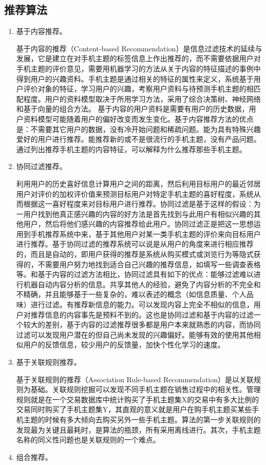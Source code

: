     \subsection{推荐算法}
    \begin{enumerate}[(1)]
    \item 基于内容推荐。

    基于内容的推荐（Content-based Recommendation）是信息过滤技术的延续与发展，它是建立在对手机主题的标签信息上作出推荐的，而不需要依据用户对手机主题的评价意见，需要用机器学习的方法从关于内容的特征描述的事例中得到用户的兴趣资料。手机主题是通过相关的特征的属性来定义，系统基于用户评价对象的特征，学习用户的兴趣，考察用户资料与待预测手机主题的相匹配程度。用户的资料模型取决于所用学习方法，采用了综合决策树、神经网络和基于向量的组合方法。 基于内容的用户资料是需要有用户的历史数据，用户资料模型可能随着用户的偏好改变而发生变化。基于内容推荐方法的优点是：不需要其它用户的数据，没有冷开始问题和稀疏问题。能为具有特殊兴趣爱好的用户进行推荐。能推荐新的或不是很流行的手机主题，没有产品问题。通过列出推荐手机主题的内容特征，可以解释为什么推荐那些手机主题。
    \item 协同过滤推荐。

    利用用户的历史喜好信息计算用户之间的距离，然后利用目标用户的最近邻居用户对评价的加权评价值来预测目标用户对特定手机主题的喜好程度，系统从而根据这一喜好程度来对目标用户进行推荐。协同过滤是基于这样的假设：为一用户找到他真正感兴趣的内容的好方法是首先找到与此用户有相似兴趣的其他用户，然后将他们感兴趣的内容推荐给此用户。协同过滤正是把这一思想运用到手机推荐系统中来，基于其他用户对某一类手机主题的评价来向目标用户进行推荐。基于协同过滤的推荐系统可以说是从用户的角度来进行相应推荐的，而且是自动的，即用户获得的推荐是系统从购买模式或浏览行为等隐式获得的，不需要用户努力地找到适合自己兴趣的推荐信息，如填写一些调查表格等。和基于内容的过滤方法相比，协同过滤具有如下的优点：能够过滤难以进行机器自动内容分析的信息。共享其他人的经验，避免了内容分析的不完全和不精确，并且能够基于一些复杂的，难以表述的概念（如信息质量、个人品味）进行过滤。有推荐新信息的能力。可以发现内容上完全不相似的信息，用户对推荐信息的内容事先是预料不到的。这也是协同过滤和基于内容的过滤一个较大的差别，基于内容的过滤推荐很多都是用户本来就熟悉的内容，而协同过滤可以发现用户潜在的但自己尚未发现的兴趣偏好。能够有效的使用其他相似用户的反馈信息，较少用户的反馈量，加快个性化学习的速度。
    \item 基于关联规则推荐。

    基于关联规则的推荐（Association Rule-based Recommendation）是以关联规则为基础。关联规则挖掘可以发现不同手机主题在销售过程中的相关性。管理规则就是在一个交易数据库中统计购买了手机主题集X的交易中有多大比例的交易同时购买了手机主题集Y，其直观的意义就是用户在购手机主题买某些手机主题的时候有多大倾向去购买另外一些手机主题。算法的第一步关联规则的发现最为关键且最耗时，是算法的瓶颈，所有采用离线进行。其次，手机主题名称的同义性问题也是关联规则的一个难点。
    \item 组合推荐。


\end{enumerate}
